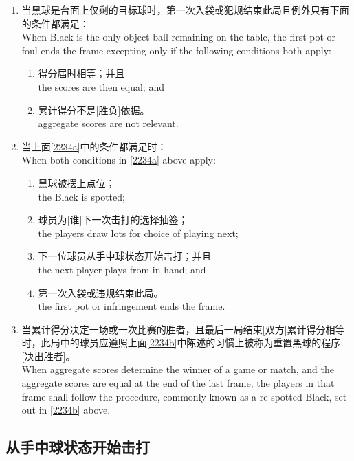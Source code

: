 \begin{enumerate}[label=(\alph*)]
    \item \label{2234a}当黑球是台面上仅剩的目标球时，第一次入袋或犯规结束此局且例外只有下面的条件都满足：\\
    When Black is the only object ball remaining on the table, the first pot or foul ends the frame excepting only if the following conditions both apply:
    \begin{enumerate}[label=(\roman*)]
        \item 得分届时相等；并且\\
        the scores are then equal; and
        \item 累计得分不是[胜负]依据。\\
        aggregate scores are not relevant.
    \end{enumerate}
    \item \label{2234b}当上面\ref{2234a}中的条件都满足时：\\
    When both conditions in \ref{2234a} above apply:
    \begin{enumerate}[label=(\roman*)]
        \item 黑球被摆上点位；\\
        the Black is spotted;
        \item 球员为[谁]下一次击打的选择抽签；\\
        the players draw lots for choice of playing next;
        \item 下一位球员从手中球状态开始击打；并且\\
        the next player plays from in-hand; and
        \item 第一次入袋或违规结束此局。\\
        the first pot or infringement ends the frame.
    \end{enumerate}
    \item 当累计得分决定一场或一次比赛的胜者，且最后一局结束[双方]累计得分相等时，此局中的球员应遵照上面\ref{2234b}中陈述的习惯上被称为重置黑球的程序[决出胜者]。\\
    When aggregate scores determine the winner of a game or match, and the aggregate scores are equal at the end of the last frame, the players in that frame shall follow the procedure, commonly known as a re-spotted Black, set out in \ref{2234b} above.
\end{enumerate}

\subsection{从手中球状态开始击打}

